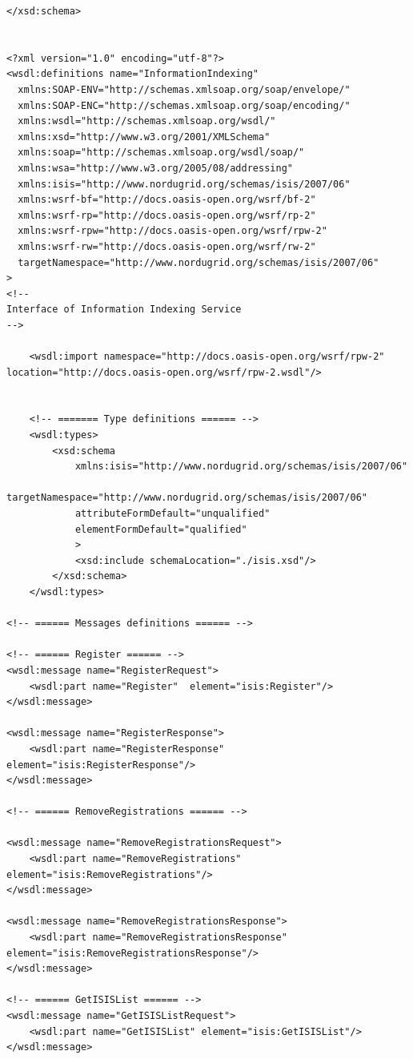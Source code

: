 \documentclass{book}
\begin{document}
\begin{verbatim}
</xsd:schema>


<?xml version="1.0" encoding="utf-8"?>
<wsdl:definitions name="InformationIndexing"
  xmlns:SOAP-ENV="http://schemas.xmlsoap.org/soap/envelope/"
  xmlns:SOAP-ENC="http://schemas.xmlsoap.org/soap/encoding/"
  xmlns:wsdl="http://schemas.xmlsoap.org/wsdl/"
  xmlns:xsd="http://www.w3.org/2001/XMLSchema"
  xmlns:soap="http://schemas.xmlsoap.org/wsdl/soap/"
  xmlns:wsa="http://www.w3.org/2005/08/addressing"
  xmlns:isis="http://www.nordugrid.org/schemas/isis/2007/06"
  xmlns:wsrf-bf="http://docs.oasis-open.org/wsrf/bf-2"
  xmlns:wsrf-rp="http://docs.oasis-open.org/wsrf/rp-2"
  xmlns:wsrf-rpw="http://docs.oasis-open.org/wsrf/rpw-2"
  xmlns:wsrf-rw="http://docs.oasis-open.org/wsrf/rw-2"
  targetNamespace="http://www.nordugrid.org/schemas/isis/2007/06"
>
<!--
Interface of Information Indexing Service
-->

    <wsdl:import namespace="http://docs.oasis-open.org/wsrf/rpw-2" location="http://docs.oasis-open.org/wsrf/rpw-2.wsdl"/>


    <!-- ======= Type definitions ====== -->
    <wsdl:types>
        <xsd:schema
            xmlns:isis="http://www.nordugrid.org/schemas/isis/2007/06"
            targetNamespace="http://www.nordugrid.org/schemas/isis/2007/06"
            attributeFormDefault="unqualified"
            elementFormDefault="qualified"
            >
            <xsd:include schemaLocation="./isis.xsd"/>
        </xsd:schema>
    </wsdl:types>

<!-- ====== Messages definitions ====== -->

<!-- ====== Register ====== -->
<wsdl:message name="RegisterRequest">
    <wsdl:part name="Register"  element="isis:Register"/>
</wsdl:message>

<wsdl:message name="RegisterResponse">
    <wsdl:part name="RegisterResponse" element="isis:RegisterResponse"/>
</wsdl:message>

<!-- ====== RemoveRegistrations ====== -->

<wsdl:message name="RemoveRegistrationsRequest">
    <wsdl:part name="RemoveRegistrations" element="isis:RemoveRegistrations"/>
</wsdl:message>

<wsdl:message name="RemoveRegistrationsResponse">
    <wsdl:part name="RemoveRegistrationsResponse" element="isis:RemoveRegistrationsResponse"/>
</wsdl:message>

<!-- ====== GetISISList ====== -->
<wsdl:message name="GetISISListRequest">
    <wsdl:part name="GetISISList" element="isis:GetISISList"/>
</wsdl:message>


\end{verbatim}
\end{document}

